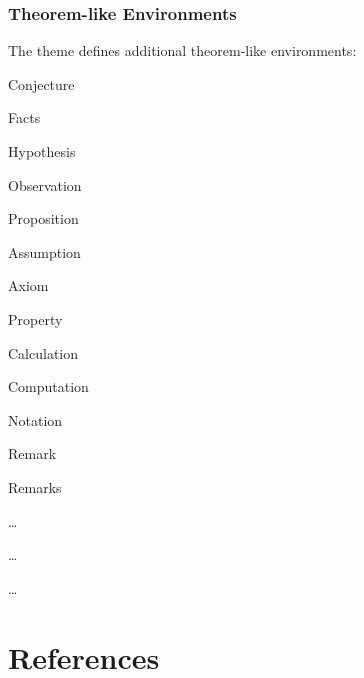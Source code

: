 \documentclass{beamer}
\begin{document}
\begin{frame}[allowframebreaks]
  \frametitle{Theorem-like Environments}

  The theme defines additional theorem-like environments:

  \vspace{2ex}

  \begin{itemize}
    \begin{minipage}{.45\linewidth}
      \item Conjecture
      \item Facts
      \item Hypothesis
      \item Observation
      \item Proposition
      \item Assumption
      \item Axiom
    \end{minipage}
    \begin{minipage}{.45\linewidth}
      \item Property
      \item Calculation
      \item Computation
      \item Notation
      \item Remark
      \item Remarks
    \end{minipage}
  \end{itemize}

  \pagebreak

  \begin{notation}
    \ldots
  \end{notation}

  \begin{axiom}
    \ldots
  \end{axiom}

  \begin{property}
    \ldots
  \end{property}

\end{frame}

\section{References}
\end{document}
